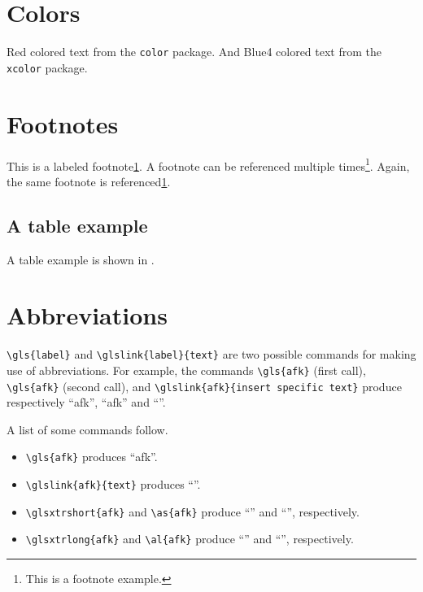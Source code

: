 \section{Colors}
\label{c2:s:colors}

{\color{red} Red colored text} from the \texttt{color} package.
{\color{Blue4} And Blue4 colored text} from the \texttt{xcolor} package.

\section{Footnotes}
\label{c2:s:footnotes}

This is a labeled footnote\cref{foot:example}.
A footnote can be referenced multiple times\footnote{\label{foot:example}This is a footnote example.}.
Again, the same footnote is referenced\cref{foot:example}.


\subsection{A table example}
\label{c2:ss:a-table-example}

A table example is shown in .

%


\section{Abbreviations}
\label{c2:s:abbreviations}

\verb+\gls{label}+ and \verb+\glslink{label}{text}+ are two possible commands for making use of abbreviations.
For example, the commands \verb+\gls{afk}+ (first call), \verb+\gls{afk}+ (second call), and \verb+\glslink{afk}{insert specific text}+ produce respectively ``\gls{afk}'', ``\gls{afk}'' and ``''.

A list of some commands follow.

\begin{itemize}
\item
\verb+\gls{afk}+ produces ``\gls{afk}''.
\item
\verb+\glslink{afk}{text}+ produces ``''.
\item
\verb+\glsxtrshort{afk}+ and \verb+\as{afk}+ produce ``'' and ``'', respectively.
\item
\verb+\glsxtrlong{afk}+ and \verb+\al{afk}+ produce ``'' and ``'', respectively.
\end{itemize}

